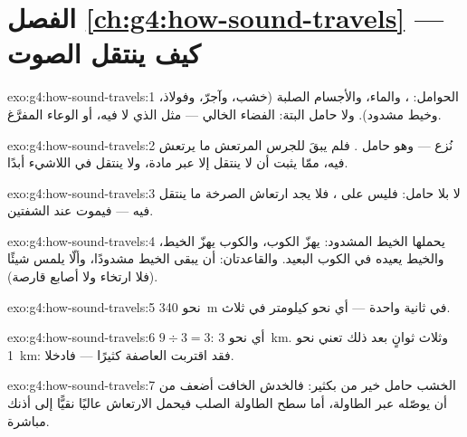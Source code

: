 \section*{الفصل \ref{ch:g4:how-sound-travels} --- كيف ينتقل الصوت}

\begin{solution}{exo:g4:how-sound-travels:1}
الحوامل: ، والماء، والأجسام الصلبة (خشب، وآجرّ، وفولاذ،
وخيط مشدود). ولا حامل البتة: الفضاء الخالي --- مثل  الذي لا
 فيه، أو الوعاء المفرَّغ.
\end{solution}

\begin{solution}{exo:g4:how-sound-travels:2}
نُزع  --- وهو حامل . فلم يبقَ للجرس المرتعش ما
يرتعش فيه، ممّا يثبت أن  لا ينتقل إلا عبر مادة، ولا ينتقل
في اللاشيء أبدًا.
\end{solution}

\begin{solution}{exo:g4:how-sound-travels:3}
لا  بلا حامل: فليس على  ، فلا يجد ارتعاش الصرخة ما
ينتقل فيه --- فيموت عند الشفتين.
\end{solution}

\begin{solution}{exo:g4:how-sound-travels:4}
يحملها الخيط المشدود:  يهزّ الكوب، والكوب يهزّ الخيط،
والخيط يعيده في الكوب البعيد. والقاعدتان: أن يبقى الخيط مشدودًا،
وألّا يلمس شيئًا (فلا ارتخاء ولا أصابع قارصة).
\end{solution}

\begin{solution}{exo:g4:how-sound-travels:5}
نحو \qty{340}{m} في ثانية واحدة --- أي نحو كيلومتر في ثلاث.
\end{solution}

\begin{solution}{exo:g4:how-sound-travels:6}
$9 \div 3 = 3$: أي نحو \qty{3}{km}. وثلاث ثوانٍ بعد ذلك تعني نحو
\qty{1}{km}: فقد اقتربت العاصفة كثيرًا --- فادخلا.
\end{solution}

\begin{solution}{exo:g4:how-sound-travels:7}
الخشب حامل خير من  بكثير: فالخدش الخافت أضعف من أن
يوصّله  عبر الطاولة، أما سطح الطاولة الصلب فيحمل الارتعاش
عاليًا نقيًّا إلى أذنك مباشرة.
\end{solution}

